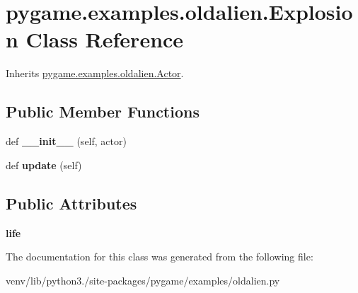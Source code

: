 \hypertarget{classpygame_1_1examples_1_1oldalien_1_1_explosion}{}\section{pygame.\+examples.\+oldalien.\+Explosion Class Reference}
\label{classpygame_1_1examples_1_1oldalien_1_1_explosion}


Inherits \hyperlink{classpygame_1_1examples_1_1oldalien_1_1_actor}{pygame.\+examples.\+oldalien.\+Actor}.

\subsection*{Public Member Functions}
\begin{DoxyCompactItemize}
\item 
\mbox{\label{classpygame_1_1examples_1_1oldalien_1_1_explosion_a9c760585e39a8f5fbae0d5d551cce18d}} 
def {\bfseries \+\_\+\+\_\+init\+\_\+\+\_\+} (self, actor)
\item 
\mbox{\label{classpygame_1_1examples_1_1oldalien_1_1_explosion_a13bce02ccb9753072f227842bbba08d1}} 
def {\bfseries update} (self)
\end{DoxyCompactItemize}
\subsection*{Public Attributes}
\begin{DoxyCompactItemize}
\item 
\mbox{\label{classpygame_1_1examples_1_1oldalien_1_1_explosion_a76bf9a384ea16f0e2ac198df5727a488}} 
{\bfseries life}
\end{DoxyCompactItemize}


The documentation for this class was generated from the following file\+:\begin{DoxyCompactItemize}
\item 
venv/lib/python3./site-\/packages/pygame/examples/oldalien.\+py\end{DoxyCompactItemize}
